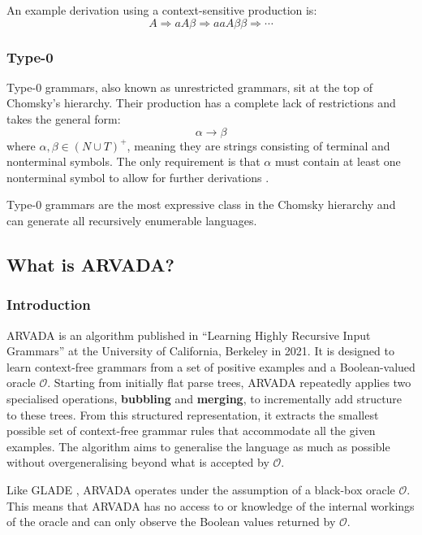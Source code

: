 An example derivation using a context-sensitive production is:
\[
A \Rightarrow aA\beta \Rightarrow aaA\beta\beta \Rightarrow \cdots
\]

\subsubsection{Type-0}

Type-0 grammars, also known as unrestricted grammars, sit at the top of Chomsky's hierarchy. Their production has a complete lack of restrictions and takes the general form:
\[
\alpha \rightarrow \beta
\]
where \( \alpha, \beta \in (N \cup T)^+ \), meaning they are strings consisting of terminal and nonterminal symbols. The only requirement is that \( \alpha \) must contain at least one nonterminal symbol to allow for further derivations \cite{hendriksConsiderItParsed,shiIntelligenceScience2021}.

Type-0 grammars are the most expressive class in the Chomsky hierarchy and can generate all recursively enumerable languages.

\subsection{What is ARVADA?}

\subsubsection{Introduction}

ARVADA is an algorithm published in \enquote{Learning Highly Recursive Input Grammars} \cite{kulkarniLearningHighlyRecursive2021} at the University of California, Berkeley in 2021. It is designed to learn context-free grammars from a set of positive examples and a Boolean-valued oracle $\mathcal{O}$. Starting from initially flat parse trees, ARVADA repeatedly applies two specialised operations, \textbf{bubbling} and \textbf{merging}, to incrementally add structure to these trees. From this structured representation, it extracts the smallest possible set of context-free grammar rules that accommodate all the given examples. The algorithm aims to generalise the language as much as possible without overgeneralising beyond what is accepted by $\mathcal{O}$.

\vspace{\baselineskip}
Like GLADE \cite{bastaniSynthesizingProgramInput}, ARVADA operates under the assumption of a black-box oracle $\mathcal{O}$. This means that ARVADA has no access to or knowledge of the internal workings of the oracle and can only observe the Boolean values returned by $\mathcal{O}$.

